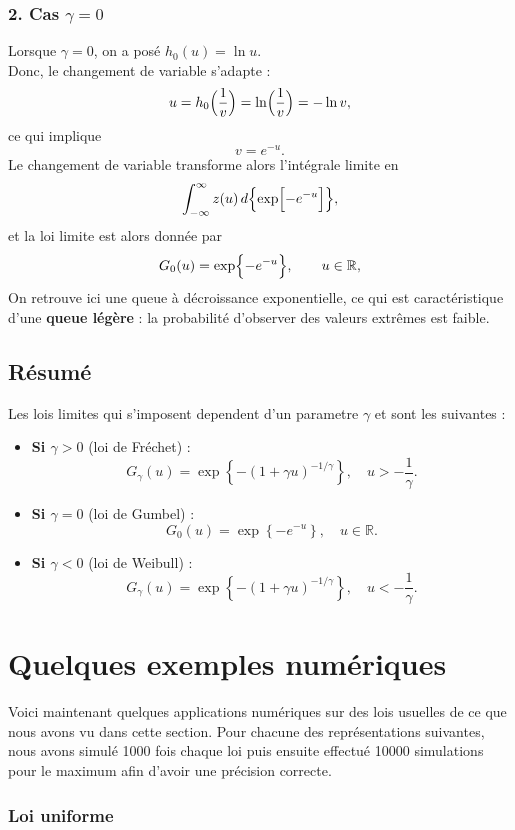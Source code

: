 \documentclass{article}
\begin{document}
\subsubsection{2. Cas \(\gamma=0\)}
Lorsque \(\gamma = 0\), on a posé $h_0(u)=\ln u$.
\\
Donc, le changement de variable s'adapte : 
\[
u=h_0\Bigl(\frac{1}{v}\Bigr)=\ln\Bigl(\frac{1}{v}\Bigr)=-\ln v,
\]
ce qui implique
\[
v=e^{-u}.
\]
Le changement de variable transforme alors l'intégrale limite en
\[
\int_{-\infty}^{\infty} z(u)\,d\Bigl\{\exp\Bigl[-e^{-u}\Bigr]\Bigr\},
\]
et la loi limite est alors donnée par
\[
G_0(u)=\exp\Bigl\{-e^{-u}\Bigr\},\qquad u\in\mathbb{R},
\]
On retrouve ici une queue à décroissance exponentielle, ce qui est caractéristique d'une \textbf{queue légère} : la probabilité d'observer des valeurs extrêmes est faible.
\\
\subsection{Résumé}
Les lois limites qui s'imposent dependent d'un parametre $\gamma$ et sont les suivantes :
\\
\begin{itemize}
    \item \textbf{Si \(\gamma>0\)} (loi de Fréchet) :
    \[
    G_\gamma(u)=\exp\left\{-\left(1+\gamma u\right)^{-1/\gamma}\right\}, \quad u > -\frac{1}{\gamma}.
    \]
    
    \item \textbf{Si \(\gamma=0\)} (loi de Gumbel) :
    \[
    G_0(u)=\exp\left\{-e^{-u}\right\}, \quad u\in\mathbb{R}.
    \]
    
    \item \textbf{Si \(\gamma<0\)} (loi de Weibull) :
    \[
    G_\gamma(u)=\exp\left\{-\left(1+\gamma u\right)^{-1/\gamma}\right\}, \quad u < -\frac{1}{\gamma}.
    \]
\end{itemize}
\newpage
\section{Quelques exemples numériques}

\noindent Voici maintenant quelques applications numériques sur des lois usuelles de ce que nous avons vu dans cette section. Pour chacune des représentations suivantes, nous avons simulé 1000 fois chaque loi puis ensuite effectué 10000 simulations pour le maximum afin d'avoir une précision correcte. 

\subsubsection{Loi uniforme}
\end{document}
